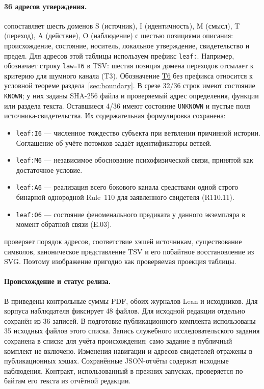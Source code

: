 \paragraph{36 адресов утверждения.}
 сопоставляет шесть доменов
S (источник), I (идентичность), M (смысл), T (переход), A (действие),
O (наблюдение) с шестью позициями описания: происхождение, состояние,
носитель, локальное утверждение, свидетельство и предел. Для адресов этой
таблицы используем префикс \texttt{leaf:}. Например, 
обозначает строку \texttt{law=T6} в TSV: шестая позиция домена переходов
отсылает к критерию для шумного канала (T3). Обозначение \hyperref[thm:conditional-bridge]{T6} без префикса
относится к условной теореме раздела~\ref{sec:boundary}. В срезе
32/36 строк имеют состояние \texttt{KNOWN}; у них заданы SHA-256 файла и
проверяемый адрес определения, функции или раздела текста.
Оставшиеся 4/36 имеют состояние \texttt{UNKNOWN} и пустые поля
источника-свидетельства. Их содержательная формулировка сохранена:
\begin{itemize}
\item \texttt{leaf:I6} --- численное тождество субъекта при ветвлении причинной истории.
Соглашение об учёте потомков задаёт идентификаторы ветвей.
\item \texttt{leaf:M6} --- независимое обоснование психофизической связи, принятой
как достаточное условие.
\item \texttt{leaf:A6} --- реализация всего бокового канала средствами одной
строго бинарной однородной Rule~110 для заявленного свидетеля (R110.11).
\item \texttt{leaf:O6} --- состояние феноменального предиката у данного экземпляра
в момент обратной связи (E.03).
\end{itemize}
 проверяет порядок
адресов, соответствие хэшей источникам, существование символов, каноническое
представление TSV и его побайтное восстановление из SVG. Поэтому изображение
пригодно как проверяемая проекция таблицы.

\paragraph{Происхождение и статус релиза.}
В  приведены контрольные суммы PDF, обоих журналов Lean и исходников. Для корпуса наблюдателя
 фиксирует 48 файлов. Для исходной редакции отдельно сохранён
 из 36 записей. В подготовке публикационного комплекта
использованы 35 исходных файлов этого списка. Запись служебного
исследовательского задания сохранена в списке для учёта происхождения;
само задание в публичный комплект не включено. Изменения навигации и
адресов свидетелей отражены в публикационных хэшах. Сохранённые
JSON-отчёты содержат исходные наблюдения. Контракт, использованный в
прежних запусках, проверяется по байтам его текста из отчётной редакции.

